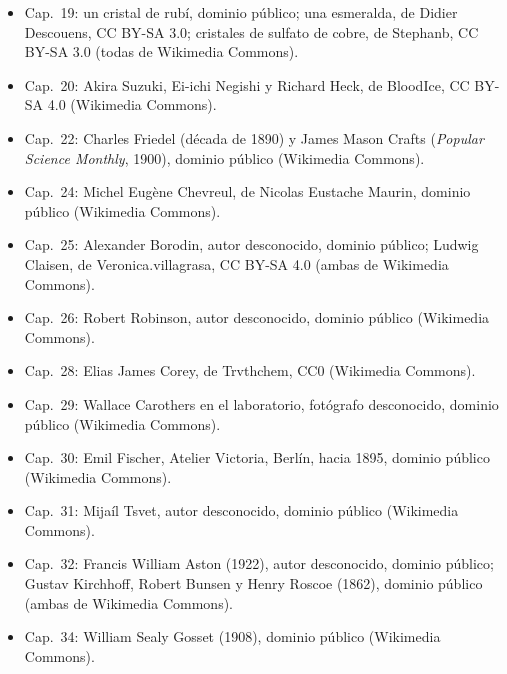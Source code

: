 \begin{itemize}
        Werner, Les Prix Nobel (1914), dominio público (ambas de Wikimedia Commons).
  \item Cap.~19: un cristal de rubí, dominio público; una esmeralda, de Didier Descouens,
        CC BY-SA 3.0; cristales de sulfato de cobre, de Stephanb, CC BY-SA 3.0 (todas de
        Wikimedia Commons).
  \item Cap.~20: Akira Suzuki, Ei-ichi Negishi y Richard Heck, de BloodIce, CC BY-SA
        4.0 (Wikimedia Commons).
  \item Cap.~22: Charles Friedel (década de 1890) y James Mason Crafts (\textit{Popular
        Science Monthly}, 1900), dominio público (Wikimedia Commons).
  \item Cap.~24: Michel Eug\`ene Chevreul, de Nicolas Eustache Maurin, dominio público
        (Wikimedia Commons).
  \item Cap.~25: Alexander Borodin, autor desconocido, dominio público; Ludwig Claisen, de
        Veronica.villagrasa, CC BY-SA 4.0 (ambas de Wikimedia Commons).
  \item Cap.~26: Robert Robinson, autor desconocido, dominio público (Wikimedia Commons).
  \item Cap.~28: Elias James Corey, de Trvthchem, CC0 (Wikimedia Commons).
  \item Cap.~29: Wallace Carothers en el laboratorio, fotógrafo desconocido, dominio público
        (Wikimedia Commons).
  \item Cap.~30: Emil Fischer, Atelier Victoria, Berlín, hacia 1895, dominio público (Wikimedia
        Commons).
  \item Cap.~31: Mijaíl Tsvet, autor desconocido, dominio público (Wikimedia Commons).
  \item Cap.~32: Francis William Aston (1922), autor desconocido, dominio público; Gustav Kirchhoff,
        Robert Bunsen y Henry Roscoe (1862), dominio público (ambas de Wikimedia Commons).
  \item Cap.~34: William Sealy Gosset (1908), dominio público (Wikimedia Commons).
\end{itemize}
\clearpage
